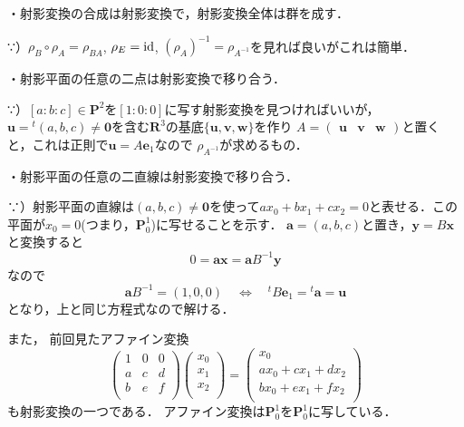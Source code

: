 ・射影変換の合成は射影変換で，射影変換全体は群を成す．

∵）$\rho_B\circ\rho_A=\rho_{BA}$,  $\rho_E =\operatorname{id}$, 
$(\rho_A)^{-1}=\rho_{A^{-1}}$を見れば良いがこれは簡単．

\emptyline

・射影平面の任意の二点は射影変換で移り合う．

∵）$[a:b:c]\in \mathbf P^2$を$[1:0:0]$に写す射影変換を見つければいいが，$\mathbf u={}^t(a,b,c)\neq \mathbf 0$を含む$\mathbf R^3$の基底$\{\mathbf u,\mathbf v, \mathbf w\}$を作り
$A=	
\begin{pmatrix}
	\mathbf u&\mathbf v&\mathbf w
\end{pmatrix}
$と置くと，これは正則で$\mathbf u=A\mathbf e_1$なので
$\rho_{A^{-1}}$が求めるもの．

\emptyline

・射影平面の任意の二直線は射影変換で移り合う．

∵）射影平面の直線は$(a,b,c)\neq \mathbf 0$を使って$ax_0+bx_1+cx_2=0$と表せる．この平面が$x_0=0$(つまり，$\mathbf P^1_0$)に写せることを示す．
$\mathbf a =(a,b,c)$と置き，$\mathbf y = B \mathbf x$と変換すると
\[
 	0= \mathbf a\mathbf x =  \mathbf a B^{-1}\mathbf y
\]
なので
\[
	\mathbf a B^{-1} = (1,0,0)\quad \Leftrightarrow \quad
	{}^tB\mathbf e_1={}^t\mathbf a=\mathbf u
\]
となり，上と同じ方程式なので解ける．

\emptyline
また， 前回見たアファイン変換
\[
	\begin{pmatrix}
    	    1&0&0\\
    		a&c&d\\
    		b&e&f\\
 	\end{pmatrix}
	\begin{pmatrix}
    	    x_0\\
    		x_1\\
    		x_2\\
 	\end{pmatrix}
	=
	\begin{pmatrix}
    		x_0\\
    	    ax_0 + cx_1 +dx_2\\
    		bx_0+ex_1+ fx_2\\
 	\end{pmatrix}
\]
も射影変換の一つである．
アファイン変換は$\mathbf P^1_0$を$\mathbf P^1_0$に写している．

